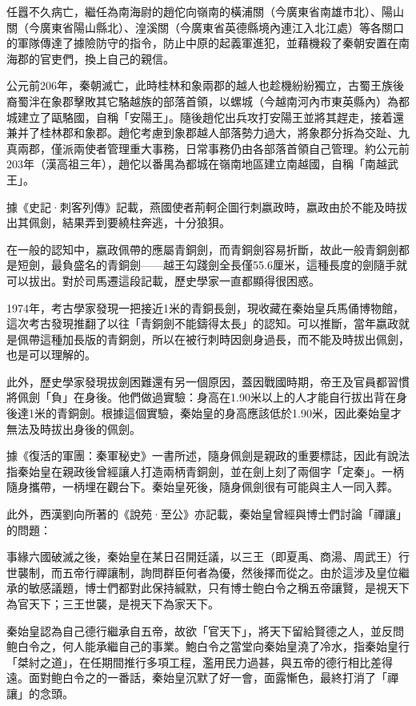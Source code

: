 任囂不久病亡，繼任為南海尉的趙佗向嶺南的橫浦關（今廣東省南雄市北）、陽山關（今廣東省陽山縣北）、湟溪關（今廣東省英德縣境內連江入北江處）等各關口的軍隊傳達了據險防守的指令，防止中原的起義軍進犯，並藉機殺了秦朝安置在南海郡的官吏們，換上自己的親信。

公元前206年，秦朝滅亡，此時桂林和象兩郡的越人也趁機紛紛獨立，古蜀王族後裔蜀泮在象郡擊敗其它駱越族的部落首領，以螺城（今越南河內市東英縣內）為都城建立了甌駱國，自稱「安陽王」。隨後趙佗出兵攻打安陽王並將其趕走，接着還兼并了桂林郡和象郡。趙佗考慮到象郡越人部落勢力過大，將象郡分拆為交趾、九真兩郡，僅派兩使者管理重大事務，日常事務仍由各部落首領自己管理。約公元前203年（漢高祖三年），趙佗以番禺為都城在嶺南地區建立南越國，自稱「南越武王」。

據《史記·刺客列傳》記載，燕國使者荊軻企圖行刺嬴政時，嬴政由於不能及時拔出其佩劍，結果弄到要繞柱奔逃，十分狼狽。

在一般的認知中，嬴政佩帶的應屬青銅劍，而青銅劍容易折斷，故此一般青銅劍都是短劍，最負盛名的青銅劍——越王勾踐劍全長僅55.6厘米，這種長度的劍隨手就可以拔出。對於司馬遷這段記載，歷史學家一直都顯得很困惑。

1974年，考古學家發現一把接近1米的青銅長劍，現收藏在秦始皇兵馬俑博物館，這次考古發現推翻了以往「青銅劍不能鑄得太長」的認知。可以推斷，當年嬴政就是佩帶這種加長版的青銅劍，所以在被行刺時因劍身過長，而不能及時拔出佩劍，也是可以理解的。

此外，歷史學家發現拔劍困難還有另一個原因，蓋因戰國時期，帝王及官員都習慣將佩劍「負」在身後。他們做過實驗：身高在1.90米以上的人才能自行拔出背在身後達1米的青銅劍。根據這個實驗，秦始皇的身高應該低於1.90米，因此秦始皇才無法及時拔出身後的佩劍。

據《復活的軍團：秦軍秘史》一書所述，隨身佩劍是親政的重要標誌，因此有說法指秦始皇在親政後曾經讓人打造兩柄青銅劍，並在劍上刻了兩個字「定秦」。一柄隨身攜帶，一柄埋在觀台下。秦始皇死後，隨身佩劍很有可能與主人一同入葬。

此外，西漢劉向所著的《說苑·至公》亦記載，秦始皇曾經與博士們討論「禪讓」的問題：

事緣六國破滅之後，秦始皇在某日召開廷議，以三王（即夏禹、商湯、周武王）行世襲制，而五帝行禪讓制，詢問群臣何者為優，然後擇而從之。由於這涉及皇位繼承的敏感議題，博士們都對此保持緘默，只有博士鲍白令之稱五帝讓賢，是視天下為官天下；三王世襲，是視天下為家天下。

秦始皇認為自己德行繼承自五帝，故欲「官天下」，將天下留給賢德之人，並反問鲍白令之，何人能承繼自己的事業。鮑白令之當堂向秦始皇澆了冷水，指秦始皇行「桀紂之道」，在任期間推行多項工程，濫用民力過甚，與五帝的德行相比差得遠。面對鲍白令之的一番話，秦始皇沉默了好一會，面露慚色，最終打消了「禪讓」的念頭。

